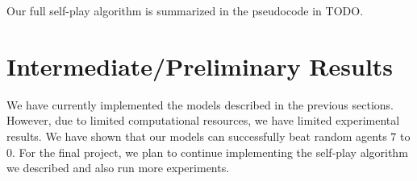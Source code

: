 \documentclass[10pt,twocolumn,letterpaper]{article}
\begin{document}
Our full self-play algorithm is summarized in the pseudocode in TODO.

\section{Intermediate/Preliminary Results}

We have currently implemented the models described in the previous sections.
However, due to limited computational resources, we have limited experimental
results. We have shown that our models can successfully beat random agents $7$
to $0$. For the final project, we plan to continue implementing the self-play
algorithm we described and also run more experiments.

{\small


}
\end{document}
